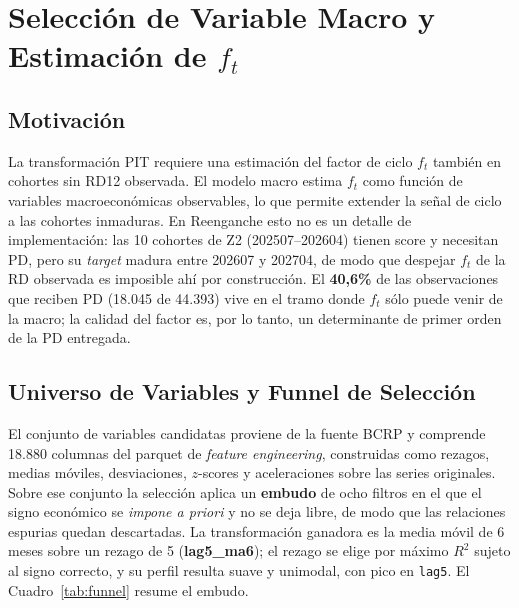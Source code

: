 \documentclass[12pt, a4paper]{article}
\newcommand{\PD}{\ensuremath{\mathrm{PD}}}
\newcommand{\ft}{\ensuremath{f_t}}
\begin{document}
\newpage

\section{Selección de Variable Macro y Estimación de $\ft$}
\label{sec:macro}

\subsection{Motivación}
La transformación PIT requiere una estimación del factor de ciclo $\ft$ también en cohortes sin
RD12 observada. El modelo macro estima $\ft$ como función de variables macroeconómicas
observables, lo que permite extender la señal de ciclo a las cohortes inmaduras. En Reenganche
esto no es un detalle de implementación: las 10 cohortes de Z2 (202507--202604) tienen score y
necesitan \PD{}, pero su \emph{target} madura entre 202607 y 202704, de modo que despejar $\ft$ de
la RD observada es imposible ahí por construcción. El \textbf{40,6\%} de las observaciones que
reciben \PD{} (18.045 de 44.393) vive en el tramo donde $\ft$ sólo puede venir de la macro; la
calidad del factor es, por lo tanto, un determinante de primer orden de la \PD{} entregada.

\subsection{Universo de Variables y Funnel de Selección}
El conjunto de variables candidatas proviene de la fuente BCRP y comprende 18.880 columnas del
parquet de \emph{feature engineering}, construidas como rezagos, medias móviles, desviaciones,
$z$-scores y aceleraciones sobre las series originales. Sobre ese conjunto la selección aplica un
\textbf{embudo} de ocho filtros en el que el signo económico se \emph{impone a priori} y no se deja
libre, de modo que las relaciones espurias quedan descartadas. La transformación ganadora es la
media móvil de 6 meses sobre un rezago de 5 (\textbf{lag5\_ma6}); el rezago se elige por máximo
$R^2$ sujeto al signo correcto, y su perfil resulta suave y unimodal, con pico en \texttt{lag5}. El
Cuadro~\ref{tab:funnel} resume el embudo.
\end{document}
